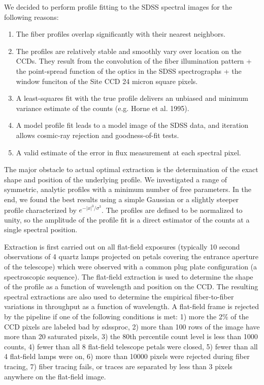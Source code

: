 \documentclass[12pt,preprint]{aastex}
\begin{document}
We decided to perform profile fitting to the 
SDSS spectral images for the following reasons:  

\begin{enumerate}

\item{The fiber profiles overlap significantly with their nearest neighbors.}

\item{The profiles are relatively stable and smoothly vary over 
location on the CCDs.  They result from the convolution of the fiber 
illumination pattern + the point-spread function
of the optics in the SDSS spectrographs + the window funciton of the 
Site CCD 24 micron square pixels. }

\item{A least-squares fit with the true profile delivers an 
unbiased and minimum variance estimate of the counts (e.g. Horne et al. 1995).}

\item{A model profile fit leads to a model image of the SDSS data,
and iteration allows cosmic-ray rejection and goodness-of-fit tests.}

\item{A valid estimate of the error in flux measurement at each spectral pixel.}

\end{enumerate}

The major obstacle to actual optimal extraction is the determination of 
the exact shape and position of the underlying profile.  
We investigated a range of symmetric, analytic profiles with a 
minimum number of free parameters.  In the end, we found the best 
results using a simple Gaussian or a slightly steeper profile 
characterized by $e^{-|x|^3/\sigma^3}$.  The profiles are defined to be 
normalized to unity, so the amplitude of the profile fit is a 
direct estimator of the counts at a single spectral position. 

Extraction is first carried out on all flat-field exposures 
(typically 10 second observations of 4 quartz lamps projected on petals covering the entrance aperture of the telescope) which were observed
with a common plug plate configuration (a spectroscopic sequence). 
The flat-field extraction is used to determine the shape of
the profile as a function of wavelength and position on the CCD.  
The resulting spectral extractions are also used to 
determine the empirical fiber-to-fiber variations in throughput 
as a function of wavelength.   
A flat-field frame is rejected by the pipeline if one of the
following conditions is met:  1) more the 2\% of the CCD pixels are labeled
bad by sdssproc, 2) more than 100 rows of the image have more than 20 saturated
pixels, 
3) the 80th percentile count level is less than 1000 counts, 
4) fewer than all 8 flat-field telescope petals were closed, 
5) fewer than all 4 flat-field lamps were on,
6) more than 10000 pixels were rejected during fiber tracing, 
7) fiber tracing fails, or traces are separated by less than 3 pixels anywhere
on the flat-field image.
\end{document}
